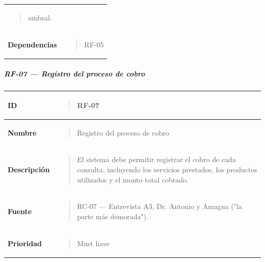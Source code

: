 \documentclass[
]{article}
\newcounter{none} %
\begin{document}
{\begin{longtable}[]{@{}
  >{\raggedright\arraybackslash}p{}
  >{\raggedright\arraybackslash}p{}@{}}
\begin{minipage}[t]{\linewidth}
\begin{quote}
umbral.
\end{quote}
\end{minipage} \\
\textbf{Dependencias} & \begin{minipage}[t]{\linewidth}\raggedright
\begin{quote}
RF-05
\end{quote}
\end{minipage} \\
\end{longtable}
}

\subparagraph{RF-07 --- Registro del proceso de
cobro}\label{rf-07-registro-del-proceso-de-cobro}

{\def\LTcaptype{none} %
\begin{longtable}[]{@{}
  >{\raggedright\arraybackslash}p{}
  >{\raggedright\arraybackslash}p{}@{}}
\toprule\noalign{}
\begin{minipage}[b]{\linewidth}\raggedright
\textbf{ID}
\end{minipage} & \begin{minipage}[b]{\linewidth}\raggedright
\begin{quote}
RF-07
\end{quote}
\end{minipage} \\
\midrule\noalign{}
\endhead
\bottomrule\noalign{}
\endlastfoot
\textbf{Nombre} & \begin{minipage}[t]{\linewidth}\raggedright
\begin{quote}
Registro del proceso de cobro
\end{quote}
\end{minipage} \\
\textbf{Descripción} & \begin{minipage}[t]{\linewidth}\raggedright
\begin{quote}
El sistema debe permitir registrar el cobro de cada consulta, incluyendo
los servicios prestados, los productos utilizados y el monto total
cobrado.
\end{quote}
\end{minipage} \\
\textbf{Fuente} & \begin{minipage}[t]{\linewidth}\raggedright
\begin{quote}
RC-07 --- Entrevista A3, Dr. Antonio y Amagua ("la parte más demorada").
\end{quote}
\end{minipage} \\
\textbf{Prioridad} & \begin{minipage}[t]{\linewidth}\raggedright
\begin{quote}
Must have
\end{quote}
\end{minipage} \\
\end{longtable}
}
\end{document}
